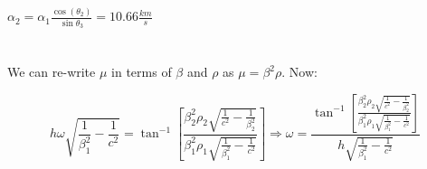 \documentclass{article}
\begin{document}
$\alpha_{2} = \alpha_{1} \frac{
\cos\left(\theta_{2}
	\right)}
{\sin{\theta_{3}}} = 10.66 \frac{km}{s}$




\section{}
We can re-write $\mu$ in terms of $\beta$ and $\rho$ as $\mu = \beta^{2} \rho$. Now:

\[
h\omega\sqrt{\frac{1}{\beta_{1}^{2}} - \frac{1}{c^{2}}} = \tan^{-1}\left[
	\frac{\beta_{2}^{2}\rho_{2}\sqrt{\frac{1}{c^{2}} - \frac{1}{\beta_{2}^{2}}}}{\beta_{1}^{2}\rho_{1}\sqrt{\frac{1}{\beta_{1}^{2}} - \frac{1}{c^{2}}}}
\right] \Rightarrow \omega = \frac{\tan^{-1}\left[
	\frac{\beta_{2}^{2}\rho_{2}\sqrt{\frac{1}{c^{2}} - \frac{1}{\beta_{2}^{2}}}}{\beta_{1}^{2}\rho_{1}\sqrt{\frac{1}{\beta_{1}^{2}} - \frac{1}{c^{2}}}}
\right]}{h\sqrt{\frac{1}{\beta_{1}^{2}} - \frac{1}{c^{2}}}}
\]
\end{document}
